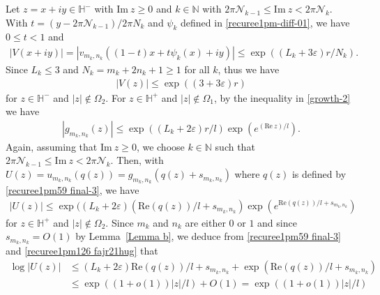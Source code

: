 \documentclass[12pt]{amsart}
\numberwithin{equation}{section}
\begin{document}
Let $z=x+iy\in \mathbb{H}^{-}$ with $\text{Im}\ z\geq 0$ and $k\in \mathbb{N}$ with $2\pi\mathcal{N}_{k-1}\leq \text{Im}\ z<2\pi\mathcal{N}_k$. With $t=(y-2\pi\mathcal{N}_{k-1})/{2\pi N_k}$ and $\psi_k$ defined in \eqref{recuree1pm-diff-01}, we have $0\leq t<1$ and
\begin{equation}\label{growth-4}
\begin{split}
|V(x+iy)|=|v_{m_k,n_k}((1-t)x+t\psi_k(x)+iy)|\leq \exp((L_k+3\varepsilon)r/N_k).
\end{split}
\end{equation}
Since $L_k\leq 3$ and $N_k=m_k+2n_k+1\geq 1$ for all $k$, thus we have
\begin{equation}\label{recuree1pm125  fajr20}
\begin{split}
|V(z)|\leq \exp((3+3\varepsilon)r)
\end{split}
\end{equation}
for $z\in \mathbb{H}^{-}$ and $|z|\not\in \Omega_2$. For $z\in \mathbb{H}^{+}$ and $|z|\not\in \Omega_1$, by the inequality in \eqref{growth-2} we have
\begin{equation*}%
\begin{split}
|g_{m_k,n_k}(z)|\leq \exp((L_k+2\varepsilon)r/l)\exp\left(e^{(\text{Re}\  z)/l}\right).
\end{split}
\end{equation*}
Again, assuming that $\text{Im}\ z\geq 0$, we choose $k\in \mathbb{N}$ such that $2\pi \mathcal{N}_{k-1}\leq \text{Im}\ z <2\pi \mathcal{N}_k$. Then, with $U(z)=u_{m_k,n_k}(q(z))=g_{m_k,n_k}(q(z)+s_{m_k,n_k})$ where $q(z)$ is defined by \eqref{recuree1pm59 final-3}, we have
\begin{equation}\label{recuree1pm126  fajr21hug}
\begin{split}
|U(z)|\leq \exp((L_k+2\varepsilon)(\text{Re}(q(z))/l+s_{m_k,n_k})\exp\left(e^{\text{Re}(q(z))/l+s_{m_k,n_k}}\right)
\end{split}
\end{equation}
for $z\in \mathbb{H}^{+}$ and $|z|\not\in \Omega_2$. Since $m_k$ and $n_k$ are either $0$ or $1$ and since $s_{m_k,n_k}=O(1)$ by Lemma~\ref{Lemma b}, we deduce from \eqref{recuree1pm59 final-3} and \eqref{recuree1pm126  fajr21hug} that
\begin{equation*}
\begin{split}
\log|U(z)|&\leq (L_k+2\varepsilon)\text{Re}(q(z))/l+s_{m_k,n_k}+\exp(\text{Re}(q(z))/l+s_{m_k,n_k})\\
&\leq \exp((1+o(1))|z|/l)+O(1)=\exp((1+o(1))|z|/l)
\end{split}
\end{equation*}
\end{document}
